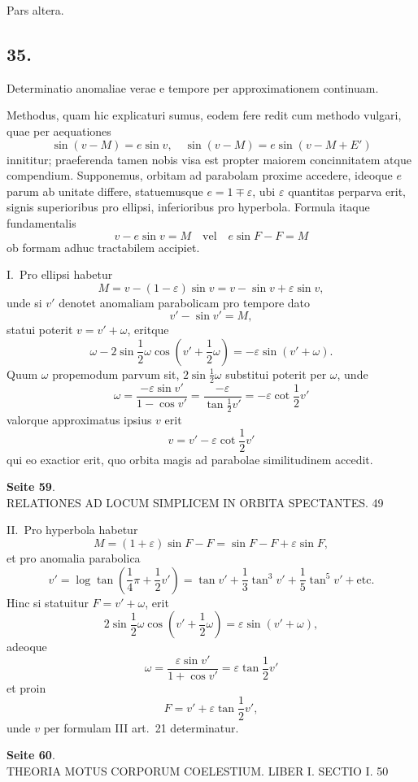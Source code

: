 \documentclass[12pt,a4paper]{article}
\begin{document}
Pars altera.

\subsection*{35.}

Determinatio anomaliae verae e tempore per approximationem continuam.

Methodus, quam hic explicaturi sumus, eodem fere redit cum methodo vulgari, quae per aequationes
\[
\sin(v - M) = e \sin v, \quad \sin(v - M) = e \sin(v - M + E')
\]
innititur; praeferenda tamen nobis visa est propter maiorem concinnitatem atque compendium. Supponemus, orbitam ad parabolam proxime accedere, ideoque $e$ parum ab unitate differe, statuemusque $e = 1 \mp \varepsilon$, ubi $\varepsilon$ quantitas perparva erit, signis superioribus pro ellipsi, inferioribus pro hyperbola. Formula itaque fundamentalis
\[
v - e \sin v = M \quad\text{vel}\quad e \sin F - F = M
\]
ob formam adhuc tractabilem accipiet.

I.~Pro ellipsi habetur
\[
M = v - (1 - \varepsilon) \sin v = v - \sin v + \varepsilon \sin v,
\]
unde si $v'$ denotet anomaliam parabolicam pro tempore dato
\[
v' - \sin v' = M,
\]
statui poterit $v = v' + \omega$, eritque
\[
\omega - 2 \sin \frac{1}{2}\omega \cos(v' + \frac{1}{2}\omega) = -\varepsilon \sin(v' + \omega).
\]
Quum $\omega$ propemodum parvum sit, $2 \sin \frac{1}{2}\omega$ substitui poterit per $\omega$, unde
\[
\omega = \frac{-\varepsilon \sin v'}{1 - \cos v'} = \frac{-\varepsilon}{\tan \frac{1}{2}v'} = -\varepsilon \cot \frac{1}{2}v'
\]
valorque approximatus ipsius $v$ erit
\[
v = v' - \varepsilon \cot \frac{1}{2}v'
\]
qui eo exactior erit, quo orbita magis ad parabolae similitudinem accedit.

\textbf{Seite 59}.\\
RELATIONES AD LOCUM SIMPLICEM IN ORBITA SPECTANTES. 49

II.~Pro hyperbola habetur
\[
M = (1 + \varepsilon) \sin F - F = \sin F - F + \varepsilon \sin F,
\]
et pro anomalia parabolica
\[
v' = \log \tan \left(\frac{1}{4}\pi + \frac{1}{2}v'\right) = \tan v' + \frac{1}{3} \tan^3 v' + \frac{1}{5} \tan^5 v' + \text{etc.}
\]
Hinc si statuitur $F = v' + \omega$, erit
\[
2 \sin \frac{1}{2}\omega \cos(v' + \frac{1}{2}\omega) = \varepsilon \sin(v' + \omega),
\]
adeoque
\[
\omega = \frac{\varepsilon \sin v'}{1 + \cos v'} = \varepsilon \tan \frac{1}{2}v'
\]
et proin
\[
F = v' + \varepsilon \tan \frac{1}{2}v',
\]
unde $v$ per formulam III art.~21 determinatur.

\textbf{Seite 60}.\\
THEORIA MOTUS CORPORUM COELESTIUM. LIBER I. SECTIO I. 50
\end{document}
